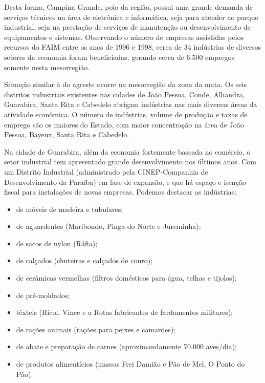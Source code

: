 Desta forma, Campina Grande, polo da região, possui uma grande demanda de serviços técnicos na área de eletrônica e informática, seja para atender ao parque industrial, seja na prestação de serviços de manutenção ou desenvolvimento de equipamentos e sistemas. Observando o número de empresas assistidas pelos recursos do FAIM entre os anos de 1996 e 1998, cerca de 34 indústrias de diversos setores da economia foram beneficiadas, gerando cerca de 6.500 empregos somente nesta mesorregião.


Situação similar à do agreste ocorre na mesorregião da zona da mata. Os seis distritos industriais existentes nas cidades de João Pessoa, Conde, Alhandra, Guarabira, Santa Rita e Cabedelo abrigam indústrias nas mais diversas áreas da atividade econômica. O número de indústrias, volume de produção e taxas de emprego são os maiores do Estado, com maior concentração na área de João Pessoa, Bayeux, Santa Rita e Cabedelo.

Na cidade de Guarabira, além da economia fortemente baseada no comércio, o setor industrial tem apresentado grande desenvolvimento nos últimos anos. Com um Distrito Industrial (administrado pela CINEP-Companhia de Desenvolvimento da Paraíba) em fase de expansão, e que há espaço e isenção fiscal para instalações de novas empresas. Podemos destacar as indústrias:

\begin{itemize}
  \item de móveis de madeira e tubulares;
  \item de aguardentes (Maribondo, Pinga do Norte e Jureminha);
  \item de sacos de nylon (Ráfia);
  \item de calçados (chuteiras e calçados de couro);
  \item de cerâmicas vermelhas (filtros domésticos para água, telhas e tijolos);
  \item de pré-moldados;
  \item têxteis (Ricol, Vince e a Rotas fabricantes de fardamentos militares);
  \item de rações animais (rações para peixes e camarões);
  \item de abate e preparação de carnes (aproximandamente 70.000 aves/dia);
  \item de produtos alimentícios (massas Frei Damião e Pão de Mel, O Ponto do Pão).
\end{itemize}

